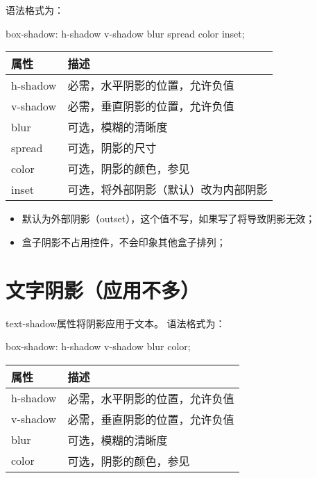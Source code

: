 语法格式为：
\begin{css}
    box-shadow: h-shadow v-shadow blur spread color inset;
\end{css}
\begin{table}[H]
    \centering
    \begin{tabular}{ll}
        \hline
        属性       & 描述                             \\
        \hline
        h-shadow & 必需，水平阴影的位置，允许负值                \\
        v-shadow & 必需，垂直阴影的位置，允许负值                \\
        blur     & 可选，模糊的清晰度                      \\
        spread   & 可选，阴影的尺寸                       \\
        color    & 可选，阴影的颜色，参见\nameref{CCS color} \\
        inset    & 可选，将外部阴影（默认）改为内部阴影             \\
        \hline
    \end{tabular}
\end{table}
\begin{itemize}
    \item 默认为外部阴影（outset），这个值不写，如果写了将导致阴影无效；
    \item 盒子阴影不占用控件，不会印象其他盒子排列；
\end{itemize}
\section{文字阴影（应用不多）}
text-shadow属性将阴影应用于文本。
语法格式为：
\begin{css}
    box-shadow: h-shadow v-shadow blur color;
\end{css}
\begin{table}[H]
    \centering
    \begin{tabular}{ll}
        \hline
        属性       & 描述                             \\
        \hline
        h-shadow & 必需，水平阴影的位置，允许负值                \\
        v-shadow & 必需，垂直阴影的位置，允许负值                \\
        blur     & 可选，模糊的清晰度                      \\
        color    & 可选，阴影的颜色，参见\nameref{CCS color} \\
        \hline
    \end{tabular}
\end{table}
